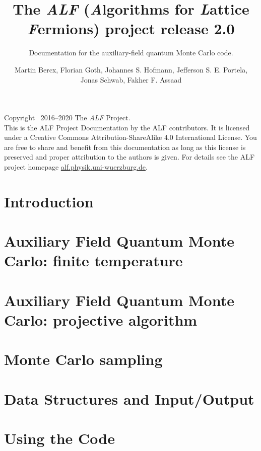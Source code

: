 \documentclass[10pt,Arial]{scrartcl}
\begin{document}
\title{The \emph{ALF} (\emph{A}lgorithms for \emph{L}attice \emph{F}ermions) project release 2.0}

\subtitle{Documentation for the  auxiliary-field quantum Monte Carlo code.}
\author{Martin Bercx,  Florian Goth,  Johannes S. Hofmann, Jefferson S. E. Portela, \\   Jonas Schwab, Fakher F. Assaad }
\maketitle

Copyright \textcopyright ~2016--2020 The \textit{ALF} Project.\\
This is the ALF Project Documentation by the ALF contributors.
It is licensed under a Creative Commons Attribution-ShareAlike 4.0 International License.
You are free to share and benefit from this documentation as long as this license is preserved
and proper attribution to the authors is given. For details see the ALF project
homepage \url{alf.physik.uni-wuerzburg.de}.
\tableofcontents
\clearpage
\section{Introduction}\label{sec:intro}

\section{Auxiliary Field Quantum Monte Carlo: finite temperature}\label{sec:def}




\section{Auxiliary Field Quantum Monte Carlo: projective algorithm}\label{sec:defT0}

\section{Monte Carlo sampling}\label{sec:sampling}


\section{Data Structures and Input/Output}\label{sec:imp}


\section{Using the Code}\label{sec:running}

\end{document}
